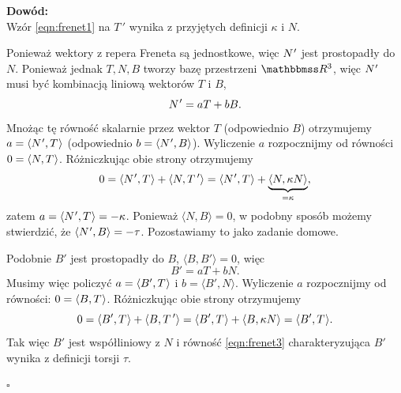 \begin{frame}

\textcolor{ared}{\textbf{Dowód:}}\pause \\
Wzór \ref{eqn:frenet1} na $T\,'$ wynika z przyjętych definicji $\kappa$ i $N$.

\pause Ponieważ wektory z repera Freneta są jednostkowe, więc $N\hspace{0.5pt}'$ jest prostopadły do $N$. Ponieważ jednak ${T,N,B}$ tworzy bazę przestrzeni $\R^3$, więc $N\hspace{0.5pt}'$ musi być kombinacją liniową wektorów $T$ i $B$,\[N\hspace{0.5pt}'=a T+b B.\] 
\pause Mnożąc tę równość skalarnie przez wektor $T$ (odpowiednio $B$) otrzymujemy $a=\langle N\hspace{0.5pt}',T\hspace{0.5pt}\rangle$ (odpowiednio $b=\langle N\hspace{0.5pt}',B\rangle$). \pause Wyliczenie $a$ rozpocznijmy od równości $0=\langle N,T\hspace{0.5pt}\rangle$. Różniczkując obie strony otrzymujemy
\pause \[0=\langle N\hspace{0.5pt}',T\hspace{0.5pt}\rangle+\langle N,T\,'\rangle=\langle N\hspace{0.5pt}',T\hspace{0.5pt}\rangle+\underbrace{\langle N,\kappa N\rangle}_{=\kappa},\]
\pause zatem $a=\langle N\hspace{0.5pt}',T\hspace{0.5pt}\rangle=-\kappa$. \pause Ponieważ $\langle N,B\rangle=0$, w podobny sposób możemy stwierdzić, że $\langle N\hspace{0.5pt}',B\rangle=-\tau$. Pozostawiamy to jako zadanie domowe.

\end{frame}
\begin{frame}[<+->]
Podobnie $B'$ jest prostopadły do $B$, $\langle B,B'\rangle=0$, więc
\[B'=a T+b N.\]
\pause Musimy więc policzyć $a=\langle B',T\hspace{0.5pt}\rangle$ i $b=\langle B',N\rangle$. Wyliczenie $a$ rozpocznijmy od równości: $0=\langle B,T\hspace{0.5pt}\rangle$. \pause Różniczkując obie strony otrzymujemy
\[0=\langle B',T\hspace{0.5pt}\rangle+\langle B,T\,'\rangle=\langle B',T\hspace{0.5pt}\rangle+\langle B,\kappa N\rangle=\langle B',T\hspace{0.5pt}\rangle.\]
\pause Tak więc $B'$ jest współliniowy z $N$ i równość \ref{eqn:frenet3} charakteryzująca $B'$ wynika z definicji torsji $\tau$.

\hfill $\square$

\end{frame}

